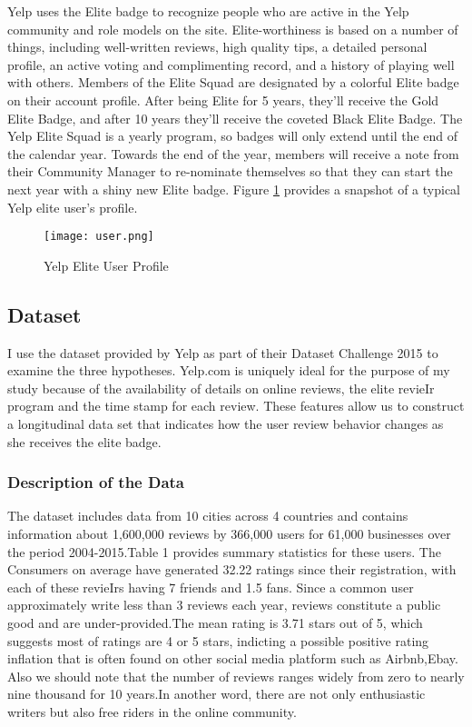 \documentclass[12pt]{article}%
\begin{document}
Yelp uses the Elite badge to recognize people who are active in the Yelp community and role models on the site. Elite-worthiness is based on a number of things, including well-written reviews, high quality tips, a detailed personal profile, an active voting and complimenting record, and a history of playing well with others. Members of the Elite Squad are designated by a colorful Elite badge on their account profile. After being Elite for 5 years, they'll receive the Gold Elite Badge, and after 10 years they'll receive the coveted Black Elite Badge. The Yelp Elite Squad is a yearly program, so badges will only extend until the end of the calendar year. Towards the end of the year, members will receive a note from their Community Manager to re-nominate themselves so that they can start the next year with a shiny new Elite badge. Figure \ref{user2} provides a snapshot of a typical Yelp elite user’s profile. 

\begin{figure}[h!]
\begin{center}
\texttt{[image: user.png]}
  \caption{Yelp Elite User Profile}
  \label{user2}
\end{center}
\end{figure}


\subsection{Dataset}

I use the dataset provided by Yelp as part of their Dataset Challenge 2015 to examine the three hypotheses. Yelp.com is uniquely ideal for the purpose of my study because of the availability of details on online reviews, the elite revieIr program and the time stamp for each review. These features allow us to construct a longitudinal data set that indicates how the user review behavior changes as she receives the elite badge.

\subsubsection{Description of the Data}

The dataset includes data from 10 cities across 4 countries and contains information about 1,600,000 reviews by 366,000 users for 61,000 businesses over the period 2004-2015.Table 1 provides summary statistics for these users. The Consumers on average have generated 32.22 ratings since their registration, with each of these revieIrs having 7 friends and 1.5 fans.  Since a common user approximately write less than 3 reviews each year, reviews constitute a public good and are under-provided.The mean rating is 3.71 stars out of 5, which suggests most of ratings are 4 or 5 stars, indicting a possible positive rating inflation that is often found on other social media platform such as Airbnb\citep{reportingandreciprocity},Ebay\citep{cabral2015dollar}. Also we should note that the number of reviews ranges widely from zero to nearly nine thousand for 10 years.In another word, there are not only enthusiastic writers but also free riders in the online community.
\end{document}
